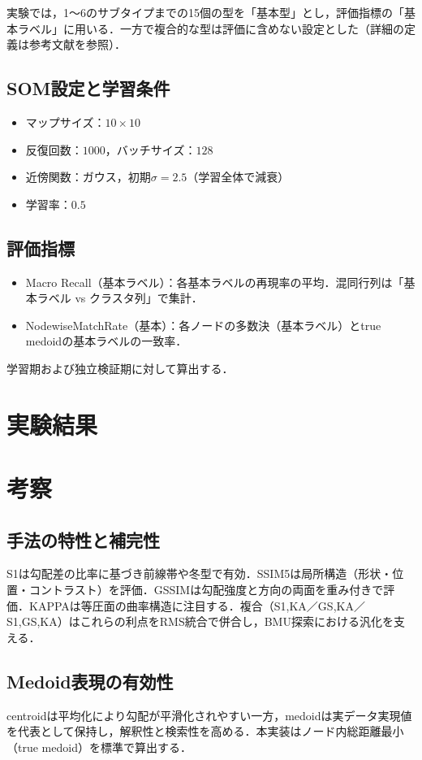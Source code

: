 \documentclass{jarticle}
\theoremstyle{definition}
\begin{document}
実験では，1〜6のサブタイプまでの15個の型を「基本型」とし，評価指標の「基本ラベル」に用いる．一方で複合的な型は評価に含めない設定とした（詳細の定義は参考文献\cite{吉野2002日本の気候}を参照）．

\subsection{SOM設定と学習条件}
\begin{itemize}
\item マップサイズ：$10\times 10$
\item 反復回数：$1000$，バッチサイズ：$128$
\item 近傍関数：ガウス，初期$\sigma=2.5$（学習全体で減衰）
\item 学習率：$0.5$
\end{itemize}

\subsection{評価指標}
\begin{itemize}
\item Macro Recall（基本ラベル）：各基本ラベルの再現率の平均．混同行列は「基本ラベル vs クラスタ列」で集計．
\item NodewiseMatchRate（基本）：各ノードの多数決（基本ラベル）とtrue medoidの基本ラベルの一致率．
\end{itemize}
学習期および独立検証期に対して算出する．

\section{実験結果}


\section{考察}
\subsection{手法の特性と補完性}
S1は勾配差の比率に基づき前線帯や冬型で有効．SSIM5は局所構造（形状・位置・コントラスト）を評価．GSSIMは勾配強度と方向の両面を重み付きで評価．KAPPAは等圧面の曲率構造に注目する．複合（S1,KA／GS,KA／S1,GS,KA）はこれらの利点をRMS統合で併合し，BMU探索における汎化を支える．

\subsection{Medoid表現の有効性}
centroidは平均化により勾配が平滑化されやすい一方，medoidは実データ実現値を代表として保持し，解釈性と検索性を高める．本実装はノード内総距離最小（true medoid）を標準で算出する．
\end{document}
